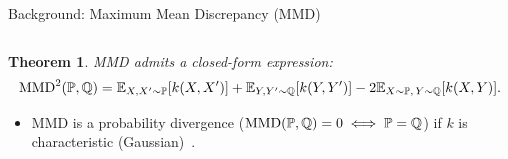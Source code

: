 \documentclass[aspectratio=169,xcolor=dvipsnames]{beamer}
\newtheorem*{thm*}{Theorem}
\let\oldcitep\citep
\renewcommand{\citep}[1]{{\scriptsize\textcolor{graytext}{\oldcitep{#1}}}}
\begin{document}
\begin{frame}{Background: Maximum Mean Discrepancy (MMD)~\citep{gretton2012kernel}}
\begin{columns}[c]
    \end{columns}
    \begin{thm*}
        MMD admits a closed-form expression:
        \begin{align*}
            \mathrm{MMD}^2(\mathbb{P}, \mathbb{Q})
            = \mathbb{E}_{X,X'\sim\mathbb{P}}[k(X,X')]
            + \mathbb{E}_{Y,Y'\sim\mathbb{Q}}[k(Y,Y')] - 2\mathbb{E}_{X\sim\mathbb{P},\,Y\sim\mathbb{Q}}[k(X,Y)] .
        \end{align*}
    \end{thm*}
    \begin{itemize}
        \item MMD is a probability divergence ($\mathrm{MMD}(\mathbb{P}, \mathbb{Q})=0 \iff \mathbb{P}=\mathbb{Q}$) if $k$ is characteristic (Gaussian)~\citep{sriperumbudur2011universality}.
    \end{itemize}
\end{frame}
\end{document}
